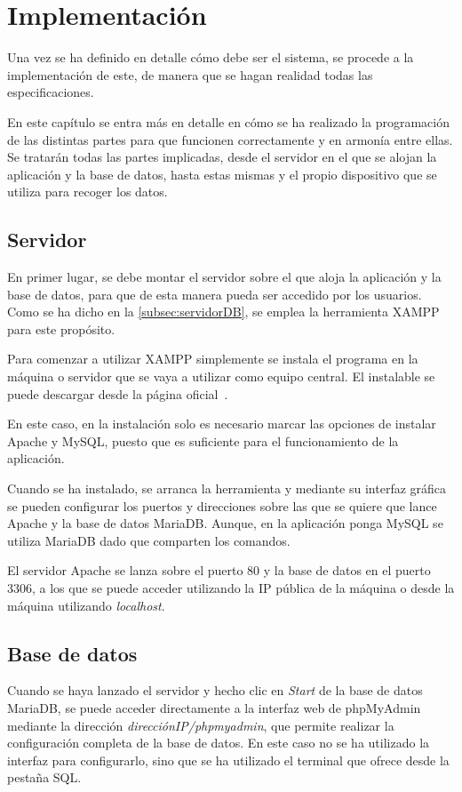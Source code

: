 \chapter{Implementación}
\label{ch:implementacion}
Una vez se ha definido en detalle cómo debe ser el sistema, se procede a la implementación de este, de manera que se hagan realidad todas las especificaciones. 

En este capítulo se entra más en detalle en cómo se ha realizado la programación de las distintas partes para que funcionen correctamente y en armonía entre ellas. Se tratarán todas las partes implicadas, desde el servidor en el que se alojan la aplicación y la base de datos, hasta estas mismas y el propio dispositivo que se utiliza para recoger los datos.

\section{Servidor}\label{sec:servidorImpl}
En primer lugar, se debe montar el servidor sobre el que aloja la aplicación y la base de datos, para que de esta manera pueda ser accedido por los usuarios. Como se ha dicho en la \autoref{subsec:servidorDB}, se emplea la herramienta XAMPP para este propósito.

Para comenzar a utilizar XAMPP simplemente se instala el programa en la máquina o servidor que se vaya a utilizar como equipo central. El instalable se puede descargar desde la página oficial~\cite{vmware_xampp_nodate}.

En este caso, en la instalación solo es necesario marcar las opciones de instalar Apache y MySQL, puesto que es suficiente para el funcionamiento de la aplicación.

Cuando se ha instalado, se arranca la herramienta y mediante su interfaz gráfica se pueden configurar los puertos y direcciones sobre las que se quiere que lance Apache y la base de datos MariaDB. Aunque, en la aplicación ponga MySQL se utiliza MariaDB dado que comparten los comandos.

El servidor Apache se lanza sobre el puerto 80 y la base de datos en el puerto 3306, a los que se puede acceder utilizando la IP pública de la máquina o desde la máquina utilizando \textit{localhost}.

\section{Base de datos}\label{sec:base-de-datos}
Cuando se haya lanzado el servidor y hecho clic en \textit{Start} de la base de datos MariaDB, se puede acceder directamente a la interfaz web de phpMyAdmin mediante la dirección \textit{direcciónIP/phpmyadmin}, que permite realizar la configuración completa de la base de datos. En este caso no se ha utilizado la interfaz para configurarlo, sino que se ha utilizado el terminal que ofrece desde la pestaña SQL\@.
\pagebreak

